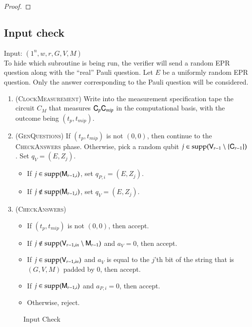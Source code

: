 \begin{proof}
	
\end{proof}


\subsection{Input check}
\label{sec:input_check}


\vspace{10pt}
\begin{center}
\begin{mdframed}
    Input: $(1^n,w,r,G,V,M)$ \\
    To hide which subroutine is being run, the verifier will send a random EPR question along with the ``real'' Pauli question. Let $E$ be a uniformly random EPR question. Only the answer corresponding to the Pauli question will be considered.\\
	\begin{enumerate}
		\item (\textsc{ClockMeasurement}) Write into the measurement specification tape the circuit $C_M$ that measures ${\mathsf{C}}_p {\mathsf{C}}_{mip}$ in the computational basis, with the outcome being $(t_p,t_{mip})$.
		\item (\textsc{GenQuestions}) If $(t_p,t_{mip})$ is not $(0,0)$, then continue to the \textsc{CheckAnswers} phase. Otherwise, pick a random qubit $j \in \operatorname{supp}({\mathsf{V}}_{r-1} \setminus \{{\mathsf{C}}_{r-1} \})$. Set $q_V = (E,Z_j)$.
		\begin{itemize}
			\item If $j \in \operatorname{supp}({\mathsf{M}}_{r-1,i})$, set $q_{P,i} = (E,Z_j)$.
			\item If $j \notin \operatorname{supp}({\mathsf{M}}_{r-1,i})$, set $q_V = (E,Z_j)$.
		\end{itemize}
		
		\item (\textsc{CheckAnswers}) 
		\begin{itemize}
			\item If $(t_p,t_{mip})$ is not $(0,0)$, then accept. 
			\item If $j \notin \operatorname{supp}({\mathsf{V}}_{r-1,in} \setminus {\mathsf{M}}_{r-1})$ and $a_V = 0$, then accept. 
			\item If $j \in \operatorname{supp}({\mathsf{V}}_{r-1,in})$ and $a_V$ is equal to the $j$'th bit of the string that is $(G,V,M)$ padded by $0$, then accept. 
			\item If $j \in \operatorname{supp}({\mathsf{M}}_{r-1,i})$ and $a_{P,i} = 0$, then accept.
			\item Otherwise, reject.
		\end{itemize}
	\end{enumerate}    
\end{mdframed}
\end{center}
\begin{figure}[H]
\caption{Input Check}
\label{fig:input_check}
\end{figure}

